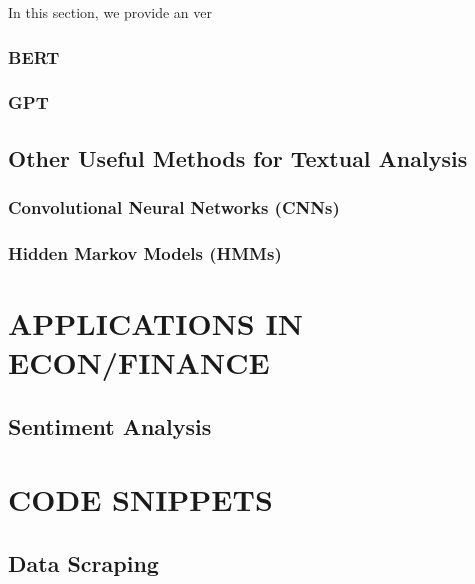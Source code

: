 \documentclass[
]{book}
\begin{document}
In this section, we provide an ver

\hypertarget{bert}{%
\section{BERT}\label{bert}}

\hypertarget{gpt}{%
\section{GPT}\label{gpt}}

\hypertarget{other-useful-methods-for-textual-analysis}{%
\chapter{Other Useful Methods for Textual Analysis}\label{other-useful-methods-for-textual-analysis}}

\hypertarget{convolutional-neural-networks-cnns}{%
\section{Convolutional Neural Networks (CNNs)}\label{convolutional-neural-networks-cnns}}

\hypertarget{hidden-markov-models-hmms}{%
\section{Hidden Markov Models (HMMs)}\label{hidden-markov-models-hmms}}

\hypertarget{part-applications-in-econfinance}{%
\part*{APPLICATIONS IN ECON/FINANCE}\label{part-applications-in-econfinance}}

\hypertarget{sentiment-analysis}{%
\chapter{Sentiment Analysis}\label{sentiment-analysis}}

\hypertarget{part-code-snippets}{%
\part*{CODE SNIPPETS}\label{part-code-snippets}}

\hypertarget{data-scraping}{%
\chapter{Data Scraping}\label{data-scraping}}
\end{document}
